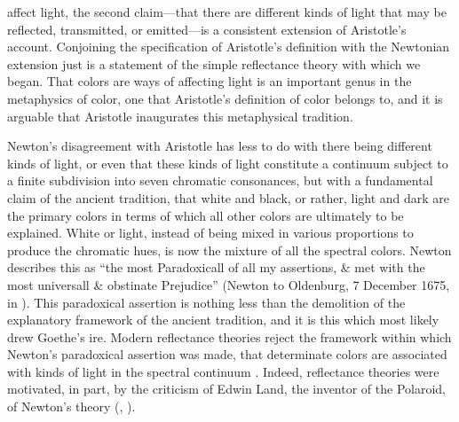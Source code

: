affect light, the second claim---that there are different kinds of light that may be reflected, transmitted, or emitted---is a consistent extension of Aristotle's account. Conjoining the specification of Aristotle's definition with the Newtonian extension just is a statement of the simple reflectance theory with which we began. That colors are ways of affecting light is an important genus in the metaphysics of color, one that Aristotle's definition of color belongs to, and it is arguable that Aristotle inaugurates this metaphysical tradition.

Newton's disagreement with Aristotle has less to do with there being different kinds of light, or even that these kinds of light constitute a continuum subject to a finite subdivision into seven chromatic consonances, but with a fundamental claim of the ancient tradition, that white and black, or rather, light and dark are the primary colors in terms of which all other colors are ultimately to be explained. White or light, instead of being mixed in various proportions to produce the chromatic hues, is now the mixture of all the spectral colors. Newton describes this as ``the most Paradoxicall of all my assertions, \& met with the most universall \& obstinate Prejudice'' (Newton to Oldenburg, 7 December 1675, in \citealt[385]{Turnbull:1959kx}). This paradoxical assertion is nothing less than the demolition of the explanatory framework of the ancient tradition, and it is this which most likely drew Goethe's ire. Modern reflectance theories reject the framework within which Newton's paradoxical assertion was made, that determinate colors are associated with kinds of light in the spectral continuum \citep{Hilbert:1987jq}. Indeed, reflectance theories were motivated, in part, by the criticism of Edwin Land, the inventor of the Polaroid, of Newton's theory (\citealt{Land:1971aa}, \citealt{Land:1977aa}).

